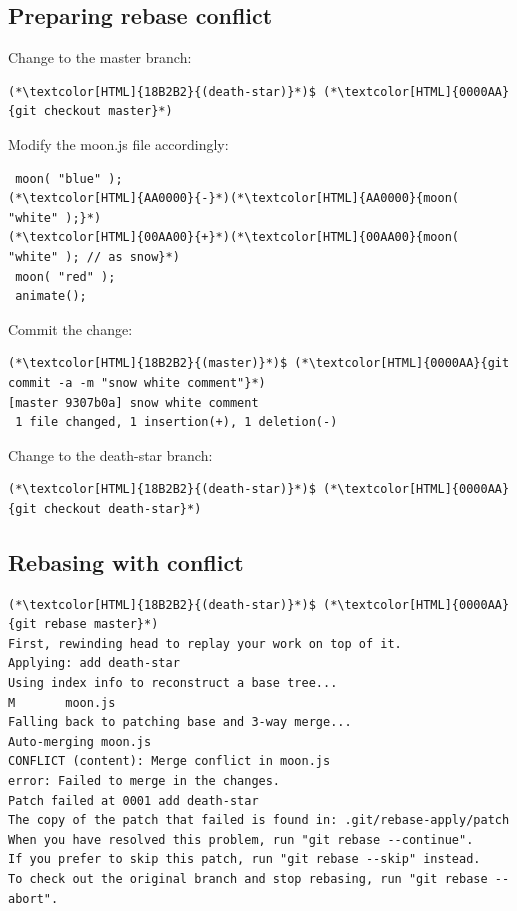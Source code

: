 \subsection{Preparing rebase conflict}
\begin{frame}[fragile]
  \subslidetitle
  Change to the master branch:
   \begin{lstlisting}
(*\textcolor[HTML]{18B2B2}{(death-star)}*)$ (*\textcolor[HTML]{0000AA}{git checkout master}*)
\end{lstlisting}

  Modify the moon.js file accordingly:
  \begin{lstlisting}
 moon( "blue" );
(*\textcolor[HTML]{AA0000}{-}*)(*\textcolor[HTML]{AA0000}{moon( "white" );}*)
(*\textcolor[HTML]{00AA00}{+}*)(*\textcolor[HTML]{00AA00}{moon( "white" ); // as snow}*)
 moon( "red" );
 animate();
\end{lstlisting}

  Commit the change:
  \begin{lstlisting}
(*\textcolor[HTML]{18B2B2}{(master)}*)$ (*\textcolor[HTML]{0000AA}{git commit -a -m "snow white comment"}*)
[master 9307b0a] snow white comment
 1 file changed, 1 insertion(+), 1 deletion(-)
\end{lstlisting}
  Change to the death-star branch:
   \begin{lstlisting}
(*\textcolor[HTML]{18B2B2}{(death-star)}*)$ (*\textcolor[HTML]{0000AA}{git checkout death-star}*)
\end{lstlisting}
\end{frame}

\subsection{Rebasing with conflict}
\begin{frame}[fragile]
  \subslidetitle
  \begin{lstlisting}
(*\textcolor[HTML]{18B2B2}{(death-star)}*)$ (*\textcolor[HTML]{0000AA}{git rebase master}*)
First, rewinding head to replay your work on top of it.
Applying: add death-star
Using index info to reconstruct a base tree...
M       moon.js
Falling back to patching base and 3-way merge...
Auto-merging moon.js
CONFLICT (content): Merge conflict in moon.js
error: Failed to merge in the changes.
Patch failed at 0001 add death-star
The copy of the patch that failed is found in: .git/rebase-apply/patch
When you have resolved this problem, run "git rebase --continue".
If you prefer to skip this patch, run "git rebase --skip" instead.
To check out the original branch and stop rebasing, run "git rebase --abort".
\end{lstlisting}
\end{frame}

